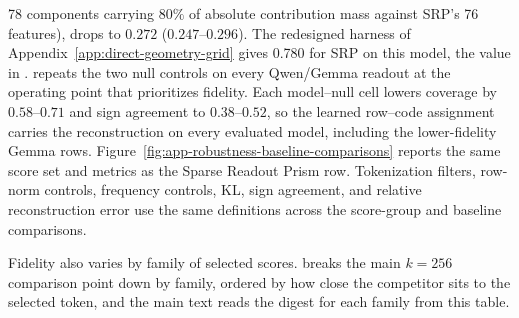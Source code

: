 78 components carrying \(80\%\) of absolute contribution mass against
SRP's 76 features), drops to \(0.272\) (\(0.247\)--\(0.296\)). The
redesigned harness of Appendix~\ref{app:direct-geometry-grid} gives 0.780 for
SRP on this model, the value in .
 repeats the two null controls on every
Qwen/Gemma readout at the operating point that prioritizes fidelity. Each
model--null cell
lowers coverage by \(0.58\)--\(0.71\) and sign agreement to
\(0.38\)--\(0.52\), so the learned row--code assignment carries the
reconstruction on every evaluated model, including the lower-fidelity
Gemma rows.
Figure~\ref{fig:app-robustness-baseline-comparisons} reports the same score set
and metrics as the Sparse Readout Prism row. Tokenization filters, row-norm
controls, frequency controls, KL, sign agreement, and relative reconstruction
error use the same definitions across the score-group and baseline
comparisons.

Fidelity also varies by family of selected scores.
 breaks the main \(k=256\) comparison point
down by family, ordered by how close the competitor sits to the selected token,
and the main text reads the digest for each family from this table.

